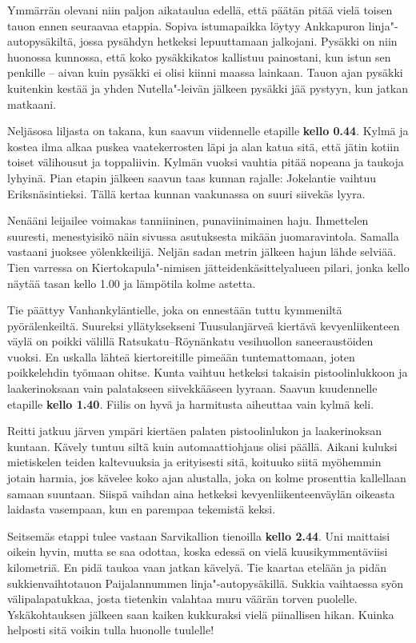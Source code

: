 \begin{multicols}{2}
Ymmärrän olevani niin paljon aikataulua edellä, että päätän pitää 
vielä toisen tauon ennen seuraavaa etappia. Sopiva istumapaikka löytyy 
Ankkapuron linja"-autopysäkiltä, jossa pysähdyn hetkeksi lepuuttamaan 
jalkojani. Pysäkki on niin huonossa kunnossa, että koko pysäkkikatos 
kallistuu painostani, kun istun sen penkille -- aivan kuin pysäkki ei olisi 
kiinni maassa lainkaan. Tauon ajan pysäkki kuitenkin kestää ja yhden 
Nutella"-leivän jälkeen pysäkki jää pystyyn, kun jatkan matkaani.

Neljäsosa liljasta on takana, kun saavun viidennelle etapille \textbf{kello 
0.44}. Kylmä ja kostea ilma alkaa puskea vaatekerrosten läpi ja alan katua 
sitä, että jätin kotiin toiset välihousut ja toppaliivin. Kylmän vuoksi 
vauhtia pitää nopeana ja taukoja lyhyinä. Pian etapin jälkeen saavun taas 
kunnan rajalle: Jokelantie vaihtuu Eriksnäsintieksi. Tällä kertaa kunnan 
vaakunassa on suuri siivekäs lyyra. 

Nenääni leijailee voimakas tanniininen, punaviinimainen haju. Ihmettelen 
suuresti, menestyisikö näin sivussa asutuksesta mikään juomaravintola. 
Samalla vastaani juoksee yölenkkeilijä. Neljän sadan metrin jälkeen hajun 
lähde selviää. Tien varressa on Kiertokapula"-nimisen 
jätteidenkäsittelyalueen pilari, jonka kello näytää tasan kello 1.00 ja 
lämpötila kolme astetta. 

Tie päättyy Vanhankyläntielle, joka on ennestään tuttu kymmeniltä 
pyörälenkeiltä. Suureksi yllätyksekseni Tuusulanjärveä kiertävä 
kevyenliikenteen väylä on poikki välillä Ratsukatu--Röynänkatu 
vesihuollon saneeraustöiden vuoksi. En uskalla lähteä kiertoreitille 
pimeään tuntemattomaan, joten poikkelehdin työmaan ohitse. Kunta vaihtuu 
hetkeksi takaisin pistoolinlukkoon ja laakerinoksaan vain palatakseen 
siivekkääseen lyyraan. Saavun kuudennelle etapille \textbf{kello 1.40}. 
Fiilis on hyvä ja harmitusta aiheuttaa vain kylmä keli. 

Reitti jatkuu järven ympäri kiertäen palaten pistoolinlukon ja laakerinoksan 
kuntaan. Kävely tuntuu siltä kuin automaattiohjaus olisi päällä. Aikani 
kuluksi mietiskelen teiden kaltevuuksia ja erityisesti sitä, koituuko siitä 
myöhemmin jotain harmia, jos kävelee koko ajan alustalla, joka on kolme 
prosenttia kallellaan samaan suuntaan. Siispä vaihdan aina hetkeksi 
kevyenliikenteenväylän oikeasta laidasta vasempaan, kun en parempaa 
tekemistä keksi.

Seitsemäs etappi tulee vastaan Sarvikallion tienoilla \textbf{kello 2.44}. Uni 
maittaisi oikein hyvin, mutta se saa odottaa, koska edessä on vielä 
kuusikymmentäviisi kilometriä. En pidä taukoa vaan jatkan kävelyä. Tie 
kaartaa etelään ja pidän sukkienvaihtotauon Paijalannummen 
linja"-autopysäkillä. Sukkia vaihtaessa syön välipalapatukkaa, josta 
tietenkin valahtaa muru väärän torven puolelle. Yskäkohtauksen jälkeen 
saan kaiken kukkuraksi vielä piinallisen hikan. Kuinka helposti sitä voikin 
tulla huonolle tuulelle!


\end{multicols}

